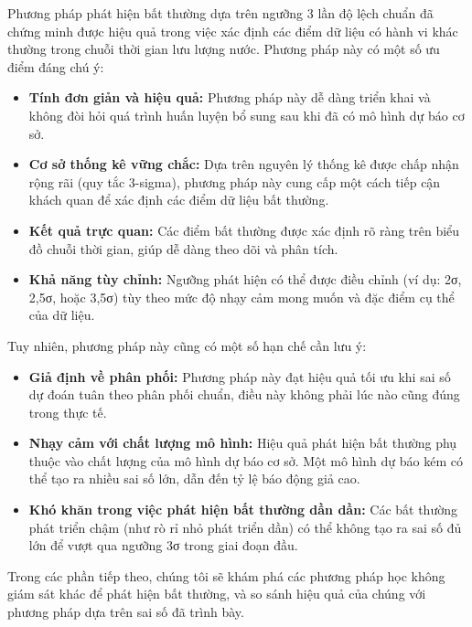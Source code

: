 Phương pháp phát hiện bất thường dựa trên ngưỡng 3 lần độ lệch chuẩn đã chứng minh được hiệu quả trong việc xác định các điểm dữ liệu có hành vi khác thường trong chuỗi thời gian lưu lượng nước. Phương pháp này có một số ưu điểm đáng chú ý:

\begin{itemize}
    \item \textbf{Tính đơn giản và hiệu quả:} Phương pháp này dễ dàng triển khai và không đòi hỏi quá trình huấn luyện bổ sung sau khi đã có mô hình dự báo cơ sở.
    
    \item \textbf{Cơ sở thống kê vững chắc:} Dựa trên nguyên lý thống kê được chấp nhận rộng rãi (quy tắc 3-sigma), phương pháp này cung cấp một cách tiếp cận khách quan để xác định các điểm dữ liệu bất thường.
    
    \item \textbf{Kết quả trực quan:} Các điểm bất thường được xác định rõ ràng trên biểu đồ chuỗi thời gian, giúp dễ dàng theo dõi và phân tích.
    
    \item \textbf{Khả năng tùy chỉnh:} Ngưỡng phát hiện có thể được điều chỉnh (ví dụ: 2σ, 2,5σ, hoặc 3,5σ) tùy theo mức độ nhạy cảm mong muốn và đặc điểm cụ thể của dữ liệu.
\end{itemize}

Tuy nhiên, phương pháp này cũng có một số hạn chế cần lưu ý:

\begin{itemize}
    \item \textbf{Giả định về phân phối:} Phương pháp này đạt hiệu quả tối ưu khi sai số dự đoán tuân theo phân phối chuẩn, điều này không phải lúc nào cũng đúng trong thực tế.
    
    \item \textbf{Nhạy cảm với chất lượng mô hình:} Hiệu quả phát hiện bất thường phụ thuộc vào chất lượng của mô hình dự báo cơ sở. Một mô hình dự báo kém có thể tạo ra nhiều sai số lớn, dẫn đến tỷ lệ báo động giả cao.
    
    \item \textbf{Khó khăn trong việc phát hiện bất thường dần dần:} Các bất thường phát triển chậm (như rò rỉ nhỏ phát triển dần) có thể không tạo ra sai số đủ lớn để vượt qua ngưỡng 3σ trong giai đoạn đầu.
\end{itemize}

Trong các phần tiếp theo, chúng tôi sẽ khám phá các phương pháp học không giám sát khác để phát hiện bất thường, và so sánh hiệu quả của chúng với phương pháp dựa trên sai số đã trình bày.

